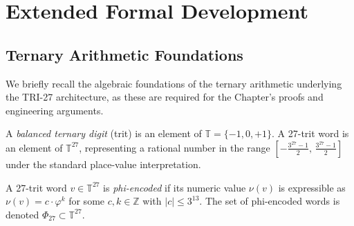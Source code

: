 %
%
%


\section{Extended Formal Development}
\label{sec:flos73-extended}

\subsection{Ternary Arithmetic Foundations}
\label{ssec:flos73-ternary-arithmetic}

We briefly recall the algebraic foundations of the ternary arithmetic
underlying the TRI-27 architecture, as these are required for the
Chapter's proofs and engineering arguments.

\begin{definition}
  A \emph{balanced ternary digit} (trit) is an element of
  $\mathbb{T} = \{-1, 0, +1\}$.  A 27-trit word is an element of
  $\mathbb{T}^{27}$, representing a rational number in the range
  $\left[-\frac{3^{27}-1}{2},\, \frac{3^{27}-1}{2}\right]$ under
  the standard place-value interpretation.
\end{definition}

\begin{definition}
  A 27-trit word $v \in \mathbb{T}^{27}$ is \emph{phi-encoded} if its
  numeric value $\nu(v)$ is expressible as $\nu(v) = c \cdot \varphi^k$
  for some $c, k \in \mathbb{Z}$ with $|c| \leq 3^{13}$.  The set of
  phi-encoded words is denoted $\Phi_{27} \subset \mathbb{T}^{27}$.
\end{definition}

